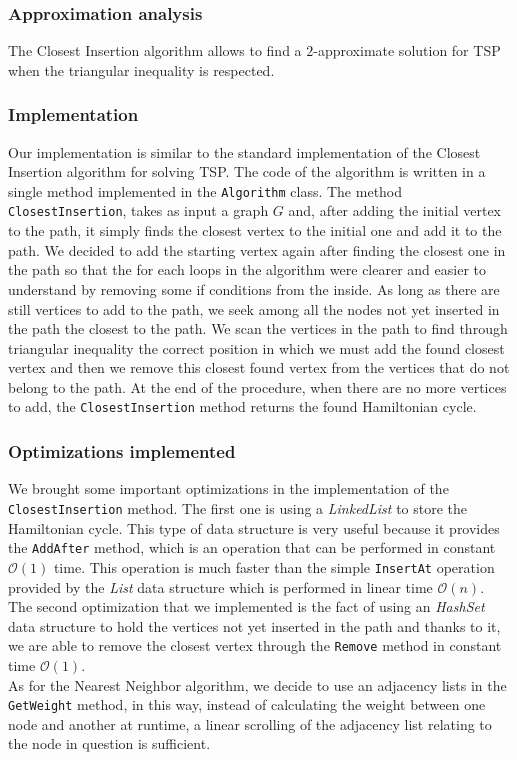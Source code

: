 \subsubsection{Approximation analysis}
The Closest Insertion algorithm allows to find a $2$-approximate solution for TSP when the triangular inequality is respected.

\subsubsection{Implementation}
Our implementation is similar to the standard implementation of the Closest Insertion algorithm for solving TSP. The code of the algorithm is written in a single method implemented in the \verb|Algorithm| class.
The method \verb|ClosestInsertion|, takes as input a graph $G$ and, after adding the initial vertex to the path, it simply finds the closest vertex to the initial one and add it to the path. We decided to add the starting vertex again after finding the closest one in the path so that the for each loops in the algorithm were clearer and easier to understand by removing some if conditions from the inside. As long as there are still vertices to add to the path, we seek among all the nodes not yet inserted in the path the closest to the path. We scan the vertices in the path to find through triangular inequality the correct position in which we must add the found closest vertex and then we remove this closest found vertex from the vertices that do not belong to the path. At the end of the procedure, when there are no more vertices to add, the \verb|ClosestInsertion| method returns the found Hamiltonian cycle.

\subsubsection{Optimizations implemented}
We brought some important optimizations in the implementation of the \verb|ClosestInsertion| method. The first one is using a \textit{LinkedList} to store the Hamiltonian cycle. This type of data structure is very useful because it provides the \verb|AddAfter| method, which is an operation that can be performed in constant $\mathcal{O}(1)$ time. This operation is much faster than the simple \verb|InsertAt| operation provided by the \textit{List} data structure which is performed in linear time $\mathcal{O}(n)$.\\ \noindent
The second optimization that we implemented is the fact of using an \textit{HashSet} data structure to hold the vertices not yet inserted in the path and thanks to it, we are able to remove the closest vertex through the \verb|Remove| method in constant time $\mathcal{O}(1)$.\\ \noindent
As for the Nearest Neighbor algorithm, we decide to use an adjacency lists in the \verb|GetWeight| method, in this way, instead of calculating the weight between one node and another at runtime, a linear scrolling of the adjacency list relating to the node in question is sufficient.

